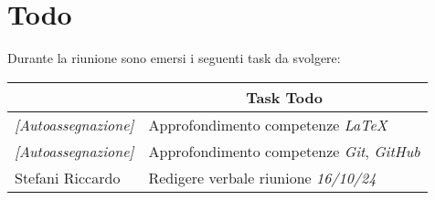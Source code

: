 \section{Todo}

Durante la riunione sono emersi i seguenti task da svolgere:

\vspace{0.5cm}

\begin{table}[htbp]
\begin{tabular}{|p{}|p{}|}
    \hline
    \rowcolor[gray]{0.9}
    \multicolumn{1}{|c|}{\textbf{Assegnatario}} & \multicolumn{1}{|c|}{\textbf{Task Todo}} \\
    \hline
    \emph{[Autoassegnazione]} & Approfondimento competenze \emph{LaTeX} \\
    \hline
    \emph{[Autoassegnazione]} & Approfondimento competenze \emph{Git}, \emph{GitHub} \\
    \hline
    Stefani Riccardo & Redigere verbale riunione \emph{16/10/24} \\
    \hline
\end{tabular}
\end{table}
